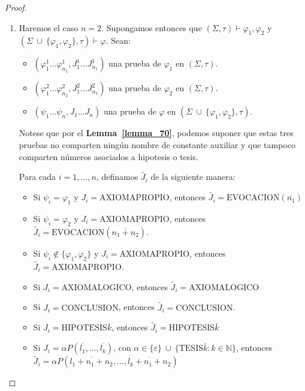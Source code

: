   \begin{proof}
    \begin{enumerate}[(1)]
      \item Haremos el caso $n = 2.$ Supongamos entonces que $(\Sigma, \tau) \vdash \varphi_{1}, \varphi_{2}$ y
        \linebreak $(\Sigma \ \cup \ \{\varphi_{1}, \varphi_{2}\}, \tau) \vdash \varphi$. Sean:
        \begin{itemize}
          \item $(\varphi_{1}^{1} \dotsc \varphi_{n_{1}}^{1}, J_{1}^{1} \dotsc J_{n_{1}}^{1})$ una prueba de
            $\varphi_{1}$ en $(\Sigma, \tau)$.
          \item $(\varphi_{1}^{2} \dotsc \varphi_{n_{2}}^{2}, J_{1}^{2} \dotsc J_{n_{2}}^{2})$ una prueba de
            $\varphi_{2}$ en $(\Sigma, \tau)$.
          \item $(\psi_{1} \dotsc \psi_{n}, J_{1} \dotsc J_{n})$ una prueba de $\varphi$ en $(\Sigma \ \cup \
            \{\varphi_{1}, \varphi_{2}\}, \tau)$.
        \end{itemize}

        \PN Notese que por el \textbf{Lemma~\ref{lemma_70}}, podemos suponer que estas tres pruebas no comparten ningún
        nombre de constante auxiliar y que tampoco comparten números asociados a hipotesis o tesis.

        \vspace{3mm}
        \PN Para cada $i = 1, \dotsc, n$, definamos $\widetilde{J_{i}}$ de la siguiente manera:
        \begin{itemize}
          \item Si $\psi_{i} = \varphi_{1}$ y $J_{i} = \mathrm{AXIOMAPROPIO}$, entonces $\widetilde{J_{i}} =
            \mathrm{EVOCACION}(\overline{n_{1}})$
          \item Si $\psi_{i} = \varphi_{2}$ y $J_{i} = \mathrm{AXIOMAPROPIO}$, entonces $\widetilde{J_{i}} =
            \mathrm{EVOCACION}(\overline{n_{1} + n_{2}})$.
          \item Si $\psi_{i} \notin \{\varphi_{1},\varphi_{2}\}$ y $J_{i} = \mathrm{AXIOMAPROPIO}$, entonces
            $\widetilde{J_{i}} = \mathrm{AXIOMAPROPIO}$.
          \item Si $J_{i} = \mathrm{AXIOMALOGICO}$, entonces $\widetilde{J_{i}}= \mathrm{AXIOMALOGICO}$
          \item Si $J_{i} = \mathrm{CONCLUSION}$, entonces $\widetilde{J_{i}} = \mathrm{CONCLUSION}$.
          \item Si $J_{i} = \mathrm{HIPOTESIS}\bar{k}$, entonces $\widetilde{J_{i}}= \mathrm{HIPOTESIS}\bar{k}$
          \item Si $J_{i} = \alpha P(\overline{l_{1}}, \dotsc, \overline{l_{k}})$, con $\alpha \in \{\varepsilon\} \
            \cup \ \{\mathrm{TESIS}\bar{k}: k \in \mathbb{N}\}$, entonces \linebreak $\widetilde{J_{i}} = \alpha
            P(\overline{l_{1} + n_{1}+n_{2}}, \dotsc, \overline{l_{k} + n_{1} + n_{2}})$
        \end{itemize}


\end{enumerate}
\end{proof}
